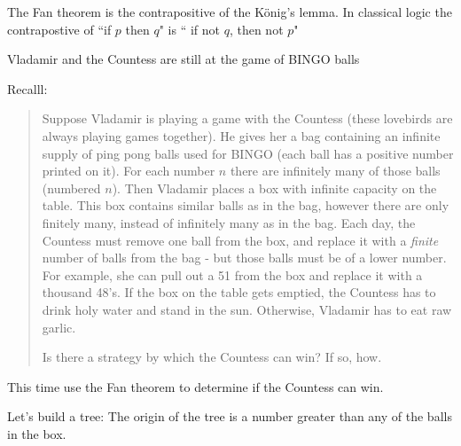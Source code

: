 \begin{remark} The Fan theorem is the contrapositive of the K\"onig's lemma.  In classical logic the contrapostive of ``if $p$ then $q$" is `` if not $q$, then not $p$"
\end{remark}

\begin{problem}
Vladamir and the Countess are still at the game of BINGO balls %

Recalll:
\begin{quotation}Suppose Vladamir is playing a game with the Countess (these lovebirds are always playing games together).  He gives her a bag containing an infinite supply of ping pong balls used for BINGO (each ball has a positive number printed on it).  For each number $n$ there are infinitely many of those balls (numbered $n$).  Then Vladamir places a box with infinite capacity on the table.  This box contains similar balls as in the bag, however there are only finitely many, instead of infinitely many as in the bag.  
Each day, the Countess must remove one ball from the box, and replace it with a \emph{finite} number of balls from the bag - but those balls must be of a lower number.  For example, she can pull out a 51 from the box and replace it with a thousand 48's.  If the box on the table gets emptied, the Countess has to drink holy water and stand in the sun.  Otherwise, Vladamir has to eat raw garlic.  

Is there a strategy by which the Countess can win?  If so, how.
\end{quotation}

 This time use the Fan theorem to determine if the Countess can win.


\ifKey
\hfill \begin{minipage}{0.5\textwidth}
\color{red} Let's build a tree: The origin of the tree is a number greater than any of the  balls in the box.
\end{minipage}
\color{black}
\fi

\end{problem}


